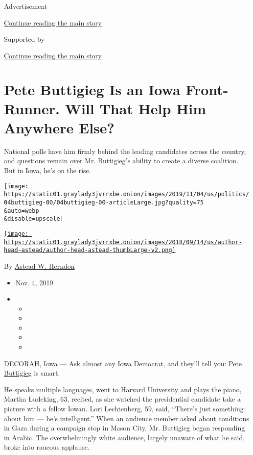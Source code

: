 Advertisement

\protect\hyperlink{after-top}{Continue reading the main story}

Supported by

\protect\hyperlink{after-sponsor}{Continue reading the main story}

\hypertarget{pete-buttigieg-is-an-iowa-front-runner-will-that-help-him-anywhere-else}{%
\section{Pete Buttigieg Is an Iowa Front-Runner. Will That Help Him
Anywhere
Else?}\label{pete-buttigieg-is-an-iowa-front-runner-will-that-help-him-anywhere-else}}

National polls have him firmly behind the leading candidates across the
country, and questions remain over Mr. Buttigieg's ability to create a
diverse coalition. But in Iowa, he's on the rise.

\texttt{[image: https://static01.graylady3jvrrxbe.onion/images/2019/11/04/us/politics/04buttigieg-00/04buttigieg-00-articleLarge.jpg?quality=75\\\&auto=webp\\\&disable=upscale]}

\href{https://www.nytimes3xbfgragh.onion/by/astead-w-herndon}{\texttt{[image: https://static01.graylady3jvrrxbe.onion/images/2018/09/14/us/author-head-astead/author-head-astead-thumbLarge-v2.png]}}

By \href{https://www.nytimes3xbfgragh.onion/by/astead-w-herndon}{Astead
W. Herndon}

\begin{itemize}
\item
  Nov. 4, 2019
\item
  \begin{itemize}
  \item
  \item
  \item
  \item
  \item
  \end{itemize}
\end{itemize}

DECORAH, Iowa --- Ask almost any Iowa Democrat, and they'll tell you:
\href{https://www.nytimes3xbfgragh.onion/interactive/2020/us/elections/pete-buttigieg.html}{Pete
Buttigieg} is smart.

He speaks multiple languages, went to Harvard University and plays the
piano, Martha Ludeking, 63, recited, as she watched the presidential
candidate take a picture with a fellow Iowan. Lori Lechtenberg, 59,
said, ``There's just something about him --- he's intelligent.'' When an
audience member asked about conditions in Gaza during a campaign stop in
Mason City, Mr. Buttigieg began responding in Arabic. The overwhelmingly
white audience, largely unaware of what he said, broke into raucous
applause.

